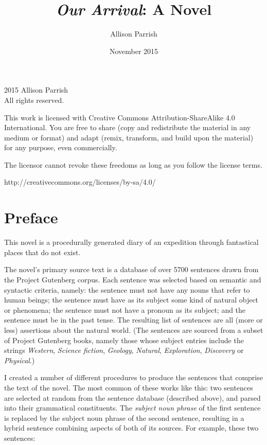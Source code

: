 \documentclass[12pt,openany]{book}
\begin{document}
\title{\textit{Our Arrival}: A Novel}
\author{Allison Parrish}
\date{November 2015}

\frontmatter
\maketitle

\pagestyle{empty}
\begingroup
\footnotesize
\parindent 0pt
\parskip \baselineskip
\textcopyright{} 2015 Allison Parrish \\
All rights reserved.

This work is licensed with Creative Commons Attribution-ShareAlike 4.0
International. You are free to share (copy and redistribute the material in any
medium or format) and adapt (remix, transform, and build upon the material) for
any purpose, even commercially.

The licensor cannot revoke these freedoms as long as you follow the license
terms.

http://creativecommons.org/licenses/by-sa/4.0/

\endgroup
\clearpage

\pagestyle{myheadings}

\chapter{Preface}

This novel is a procedurally generated diary of an expedition through
fantastical places that do not exist.

The novel's primary source text is a database of over 5700 sentences drawn from
the Project Gutenberg corpus. Each sentence was selected based on semantic and
syntactic criteria, namely: the sentence must not have any nouns that refer to
human beings; the sentence must have as its subject some kind of natural object
or phenomena; the sentence must not have a pronoun as its subject; and the
sentence must be in the past tense. The resulting list of sentences are all
(more or less) assertions about the natural world. (The sentences are sourced
from a subset of Project Gutenberg books, namely those whose subject entries
include the strings \textit{Western}, \textit{Science fiction},
\textit{Geology}, \textit{Natural}, \textit{Exploration}, \textit{Discovery} or
\textit{Physical}.)

I created a number of different procedures to produce the sentences that
comprise the text of the novel. The most common of these works like this: two
sentences are selected at random from the sentence database (described above),
and parsed into their grammatical constituents. The \textit{subject noun
phrase} of the first sentence is replaced by the subject noun phrase of the
second sentence, resulting in a hybrid sentence combining aspects of both of
its sources. For example, these two sentences:
\end{document}
